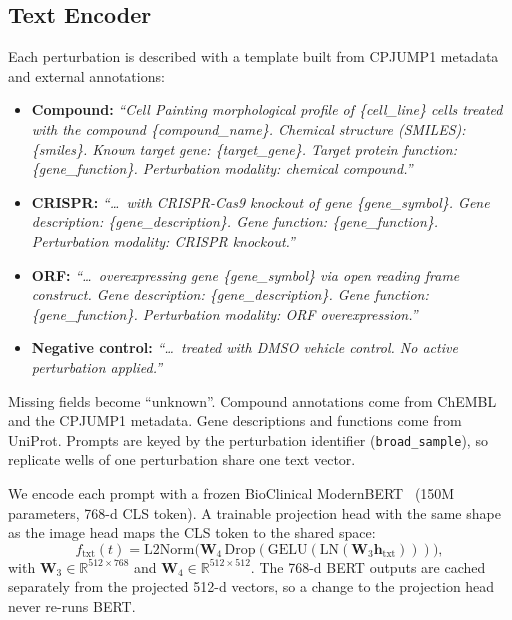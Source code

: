 \subsection{Text Encoder}

Each perturbation is described with a template built from CPJUMP1 metadata and external
annotations:

\begin{itemize}
  \item \textbf{Compound:}
        \textit{``Cell Painting morphological profile of \{cell\_line\} cells treated with the
          compound \{compound\_name\}. Chemical structure (SMILES): \{smiles\}. Known target gene:
          \{target\_gene\}. Target protein function: \{gene\_function\}. Perturbation modality:
          chemical compound.''}
  \item \textbf{CRISPR:}
        \textit{``\dots\ with CRISPR-Cas9 knockout of gene \{gene\_symbol\}. Gene description:
          \{gene\_description\}. Gene function: \{gene\_function\}. Perturbation modality: CRISPR
          knockout.''}
  \item \textbf{ORF:}
        \textit{``\dots\ overexpressing gene \{gene\_symbol\} via open reading frame construct.
          Gene description: \{gene\_description\}. Gene function: \{gene\_function\}. Perturbation
          modality: ORF overexpression.''}
  \item \textbf{Negative control:}
        \textit{``\dots\ treated with DMSO vehicle control. No active perturbation applied.''}
\end{itemize}

Missing fields become ``unknown''. Compound annotations come from ChEMBL and the CPJUMP1 metadata.
Gene descriptions and functions come from UniProt. Prompts are keyed by the perturbation identifier
(\texttt{broad\_sample}), so replicate wells of one perturbation share one text vector.

We encode each prompt with a frozen BioClinical ModernBERT~\cite{sounack2025bioclinical} (150M
parameters, 768-d CLS token). A trainable projection head with the same shape as the image head
maps the CLS token to the shared space:
\begin{equation}
  f_{\text{txt}}(t)
  = \text{L2Norm}\bigl(
  \mathbf{W}_4\,
  \text{Drop}(\text{GELU}(\text{LN}(\mathbf{W}_3 \mathbf{h}_{\text{txt}})))
  \bigr),
\end{equation}
with $\mathbf{W}_3 \in \mathbb{R}^{512 \times 768}$ and
$\mathbf{W}_4 \in \mathbb{R}^{512 \times 512}$. The 768-d BERT outputs are cached separately from
the projected 512-d vectors, so a change to the projection head never re-runs BERT.

